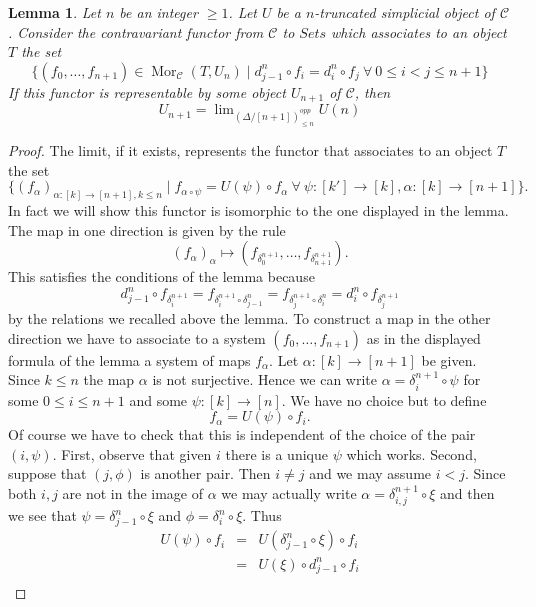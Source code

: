 \documentclass{stacks-project}
\theoremstyle{plain}
\newtheorem{lemma}[subsection]{Lemma}
\theoremstyle{definition}
\theoremstyle{remark}
\numberwithin{equation}{subsection}
\def\lim{\mathop{\mathrm{lim}}\nolimits}
\def\Mor{\mathop{\mathrm{Mor}}\nolimits}
\begin{document}
\begin{lemma}
\label{lemma-formula-limit}
Let $n$ be an integer $\geq 1$.
Let $U$ be a $n$-truncated simplicial object of $\mathcal{C}$.
Consider the contravariant functor from $\mathcal{C}$ to
$\textit{Sets}$ which associates to an object $T$ the set
$$
\{ (f_0, \ldots, f_{n + 1}) \in \Mor_\mathcal{C}(T, U_n)
\mid
d^n_{j - 1} \circ f_i = d^n_i \circ f_j
\ \forall\ 0\leq i < j\leq n + 1\}
$$
If this functor is representable by some object $U_{n + 1}$
of $\mathcal{C}$, then
$$
U_{n + 1} = \lim_{(\Delta/[n + 1])_{\leq n}^{opp}} U(n)
$$
\end{lemma}

\begin{proof}
The limit, if it exists, represents the functor
that associates to an object $T$ the set
$$
\{
(f_\alpha)_{\alpha : [k] \to [n + 1], k \leq n}
\mid
f_{\alpha \circ \psi} = U(\psi) \circ f_\alpha\ \forall
\ \psi : [k'] \to [k], \alpha : [k] \to [n + 1]
\}.
$$
In fact we will show this functor is isomorphic to the
one displayed in the lemma. The map in one direction
is given by the rule
$$
(f_\alpha)_{\alpha}
\longmapsto
(f_{\delta^{n + 1}_0}, \ldots, f_{\delta^{n + 1}_{n + 1}}).
$$
This satisfies the conditions of the lemma because
$$
d^n_{j - 1} \circ f_{\delta^{n + 1}_i} =
f_{\delta^{n + 1}_i \circ \delta^n_{j - 1}} =
f_{\delta^{n + 1}_j \circ \delta^n_i} =
d^n_i \circ f_{\delta^{n + 1}_j}
$$
by the relations we recalled above the lemma. To construct a map
in the other direction we have to associate to a system
$(f_0, \ldots, f_{n + 1})$ as in the displayed formula
of the lemma a system of maps $f_\alpha$. Let $\alpha : [k] \to [n + 1]$
be given. Since $k \leq n$ the map $\alpha$ is not surjective.
Hence we can write $\alpha = \delta^{n + 1}_i \circ \psi$
for some $0 \leq i \leq n + 1$ and some
$\psi : [k] \to [n]$. We have no choice but to define
$$
f_\alpha = U(\psi) \circ f_i.
$$
Of course we have to check that this is independent of the
choice of the pair $(i, \psi)$. First, observe that given $i$
there is a unique $\psi$ which works. Second, suppose that $(j, \phi)$ is
another pair. Then $i \not = j$ and we may assume $i < j$. Since
both $i, j$ are not in the image of $\alpha$ we may actually
write $\alpha = \delta^{n + 1}_{i, j} \circ \xi$ and then
we see that $\psi = \delta^n_{j - 1} \circ \xi$ and
$\phi = \delta^n_i \circ \xi$. Thus
\begin{eqnarray*}
U(\psi) \circ f_i & = & U(\delta^n_{j - 1} \circ \xi) \circ f_i \\
& = & U(\xi) \circ d^n_{j - 1} \circ f_i \\

\end{eqnarray*}
\end{proof}
\end{document}
